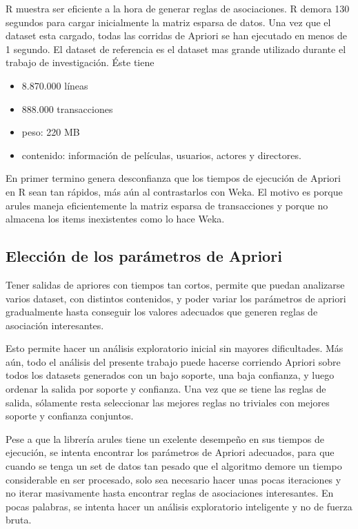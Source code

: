 \documentclass[journal]{IEEEtran}
\begin{document}
R muestra ser eficiente a la hora de generar reglas de asociaciones. R demora 130 segundos para
cargar inicialmente la matriz esparsa de datos. Una vez que el dataset esta cargado, todas las
corridas de Apriori se han ejecutado en menos de 1 segundo. El dataset de referencia es el
dataset mas grande utilizado durante el trabajo de investigación. Éste tiene
\begin{itemize}
	\item 8.870.000 líneas
	\item 888.000 transacciones
	\item peso: 220 MB
	\item contenido: información de películas, usuarios, actores y directores.
\end{itemize}

En primer termino genera desconfianza  que los tiempos de ejecución de Apriori en R 
sean tan rápidos,
más aún al contrastarlos con Weka. 
El motivo es porque arules maneja eficientemente la matriz esparsa de transacciones y
porque no almacena los items inexistentes como lo hace Weka.


\subsection{Elección de los parámetros de Apriori}

Tener salidas de apriores con tiempos tan cortos, permite que puedan analizarse 
varios dataset, con distintos contenidos, y poder variar los parámetros de apriori gradualmente
hasta conseguir los valores adecuados que generen reglas de asociación interesantes.

Esto permite hacer un análisis exploratorio inicial sin mayores dificultades. Más aún, todo el 
análisis del presente trabajo puede hacerse corriendo Apriori sobre todos los datasets generados
con un bajo soporte, una baja confianza, y luego ordenar la salida por soporte y confianza.
Una vez que se tiene las reglas de salida, sólamente resta seleccionar las mejores reglas 
no triviales con mejores soporte y confianza conjuntos.

Pese a que la librería arules tiene un exelente desempeño en sus tiempos de ejecución, se intenta
encontrar los parámetros de Apriori adecuados, para que cuando se tenga un set de datos tan pesado
que el algoritmo demore un tiempo considerable en ser procesado, 
solo sea necesario hacer unas pocas iteraciones y
no iterar masivamente hasta encontrar reglas de asociaciones interesantes. En pocas palabras,
se intenta hacer un análisis exploratorio inteligente y no de fuerza bruta.
\end{document}
